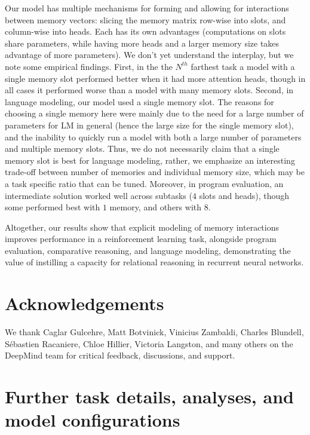 \documentclass{article}
\begin{document}
Our model has multiple mechanisms for forming and allowing for interactions between memory vectors: slicing the memory matrix row-wise into slots, and column-wise into heads. Each has its own advantages (computations on slots share parameters, while having more heads and a larger memory size takes advantage of more parameters). We don't yet understand the interplay, but we note some empirical findings. First, in the the $N^{th}$ farthest task a model with a single memory slot performed better when it had more attention heads, though in all cases it performed worse than a model with many memory slots. Second, in language modeling, our model used a single memory slot. The reasons for choosing a single memory here were mainly due to the need for a large number of parameters for LM in general (hence the large size for the single memory slot), and the inability to quickly run a model with both a large number of parameters and multiple memory slots. Thus, we do not necessarily claim that a single memory slot is best for language modeling, rather, we emphasize an interesting trade-off between number of memories and individual memory size, which may be a task specific ratio that can be tuned. Moreover, in program evaluation, an intermediate solution worked well across subtasks ($4$ slots and heads), though some performed best with $1$ memory, and others with $8$. 

Altogether, our results show that explicit modeling of memory interactions improves performance in a reinforcement learning task, alongside program evaluation, comparative reasoning, and language modeling, demonstrating the value of instilling a capacity for relational reasoning in recurrent neural networks.  
\section*{Acknowledgements}
We thank Caglar Gulcehre, Matt Botvinick, Vinicius Zambaldi, Charles Blundell, S\'ebastien Racaniere, Chloe Hillier, Victoria Langston, and many others on the DeepMind team for critical feedback, discussions, and support.

\clearpage
\small



\clearpage
\appendix

\section{Further task details, analyses, and model configurations}
\end{document}
